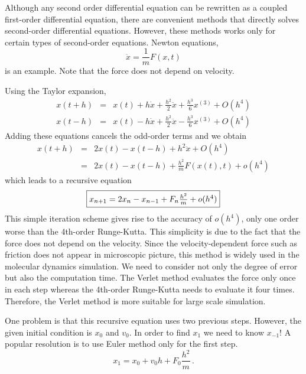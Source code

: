 \smallskip
Although any second order differential equation can be rewritten as
a coupled first-order differential equation, there are convenient
methods that directly solves second-order differential equations.
However, these methods works only for certain types of
second-order equations.  Newton equations,
\begin{equation}
\ddot{x} = \frac{1}{m} F(x,t)
\label{eq:newton}
\end{equation}
is an example.  Note that the force does not depend on velocity.

Using the Taylor expansion,
\begin{eqnarray}
x(t+h) & = & x(t) + h \dot{x}
 + \frac{h^2}{2} \ddot{x} + \frac{h^3}{6} x^{(3)}
 + O(h^4) \\
x(t-h) & = & x(t) - h \dot{x}
 + \frac{h^2}{2}\ddot{x} - \frac{h^3}{6} x^{(3)}
 + O(h^4) 
\end{eqnarray}
Adding these equations cancels the odd-order terms and we obtain
\begin{eqnarray}
x(t+h) & = & 2 x(t) - x(t-h) + h^2 \ddot{x} + O(h^4) \\
       & = & 2 x(t) - x(t-h) + \frac{h^2}{m} F(x(t),t) + o(h^4)
\end{eqnarray}
which leads to a recursive equation
\begin{equation}
\fbox{$x_{n+1} = 2 x_n - x_{n-1} + F_n \frac{h^2}{m} + o(h^4)$}
\end{equation}
This simple iteration scheme gives rise to the accuracy of $o(h^4)$, only one order worse than the 4th-order Runge-Kutta. This simplicity is due to the fact that the force does not depend
on the velocity. Since the velocity-dependent force such as friction does not appear in microscopic picture, this method is widely used in the molecular dynamics simulation.  We need to consider not only the degree of error but also the computation time.  The Verlet method evaluates the force only once in each step whereas the 4th-order Runge-Kutta needs to evaluate it four times.  Therefore, the Verlet method is more suitable for large scale simulation.

One problem is that this recursive equation uses two previous steps.  However, the given initial condition is
$x_0$ and $v_0$.  In order to find $x_1$ we need to know $x_{-1}$!   A popular resolution is to use Euler method only for the first step.
\begin{equation}
x_{1} = x_0 + v_0 h + F_0 \frac{h^2}{m}\, .
\end{equation}

